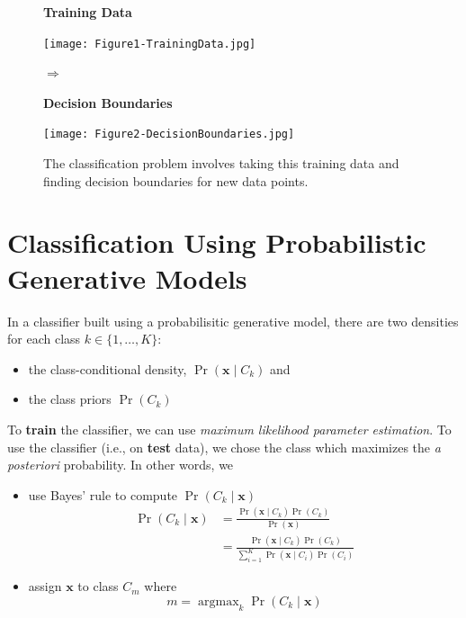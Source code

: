\documentclass[11pt]{article}
\DeclareMathOperator*{\argmax}{argmax}
\newcommand{\xb}{\mathbf{x}}
\begin{document}
\begin{figure}[h]
\begin{minipage}{0.45\textwidth}
\textbf{Training Data}

\texttt{[image: Figure1-TrainingData.jpg]}
\end{minipage} \hfill
\begin{minipage}{0.05\textwidth}
\begin{center}
{\Huge $\Rightarrow$}
\end{center}
\end{minipage}
\hfill
\begin{minipage}{0.45\textwidth}
\textbf{Decision Boundaries}

\texttt{[image: Figure2-DecisionBoundaries.jpg]}
\end{minipage}
\caption{The classification problem involves taking this training data and finding decision boundaries for new data points.}
\end{figure}




\section{Classification Using Probabilistic Generative Models}
In a classifier built using a probabilisitic generative model, there are two densities for each class $k \in \lbrace 1, \ldots, K\rbrace$:
\begin{itemize}
\item the class-conditional density, $\Pr \left(\xb \mid C_k\right)$ and
\item the class priors $\Pr \left(C_k\right)$
\end{itemize}

To \textbf{train} the classifier, we can use \textit{maximum likelihood parameter estimation}. To use the classifier (i.e., on \textbf{test} data), we chose the class which maximizes the \textit{a posteriori} probability. In other words, we
\begin{itemize}
\item use Bayes' rule to compute $\Pr \left(C_k \mid \xb\right)$
\begin{equation}
    \begin{split}
        \Pr \left(C_k \mid \xb\right) &= \frac{\Pr\left(\xb \mid C_k\right) \Pr\left(C_k\right)}{\Pr\left(\xb\right)} \\
                    &= \frac{\Pr\left(\xb \mid C_k\right) \Pr\left(C_k\right)}{\sum_{i=1}^{K} \Pr\left(\xb \mid C_i\right) \Pr\left(C_i\right)}
    \end{split}
\end{equation}

\item assign $\xb$ to class $C_m$ where
\begin{equation}
	m = \argmax_k \Pr \left(C_k \mid \xb\right)
 \end{equation}
\end{itemize}
\end{document}
